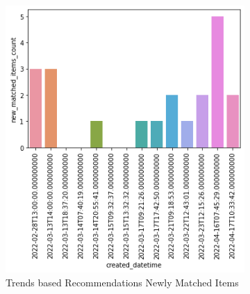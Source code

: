 \documentclass[manuscript,natbib=false]{acmart}
\begin{document}
\begin{figure}[h]
     \centering
     \begin{subfigure}[b]{0.47\linewidth}
         \centering
         \includegraphics[width=\linewidth]{images/new_matched_items_per_day.png}
         \caption{Trends based Recommendations Newly Matched Items}
         \label{fig:trends-recsys-trends-new-matches}
     \end{subfigure}
     \hfill
     \begin{subfigure}[b]{0.47\linewidth}
         \centering

\end{subfigure}
\end{figure}
\end{document}
